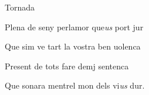 \documentclass[12pt]{article}
\begin{document}
\begin{estrofaExtra}%




\begin{tornada}

\textsection{}Tornada

\end{tornada}


\end{estrofaExtra}


\begin{estrofa}

 Plena de seny perlamor que\textit{us} port jur

 Que sim ve tart la vostra ben uolenca

 Present de tots fare demj sentenca

 Que sonara mentrel mon dels vi\textit{us} dur.

\end{estrofa}
\end{document}
